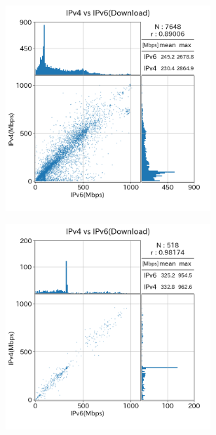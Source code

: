 \begin{figure}[htbp]
    \begin{center}
        \begin{minipage}[t]{0.48\textwidth}
            \begin{center}
                \begin{subfigure}[b]{\textwidth}
                    \centering
                    \includegraphics[width=0.85\textwidth]{fig/old_FTTH_dl.png}
                    \label{old_FTTH_dl}
                \end{subfigure}
                \begin{subfigure}[b]{\textwidth}
                    \centering
                    \includegraphics[width=0.85\textwidth]{fig/old_CATV_dl.png}

\end{subfigure}
\end{center}
\end{minipage}
\end{center}
\end{figure}

